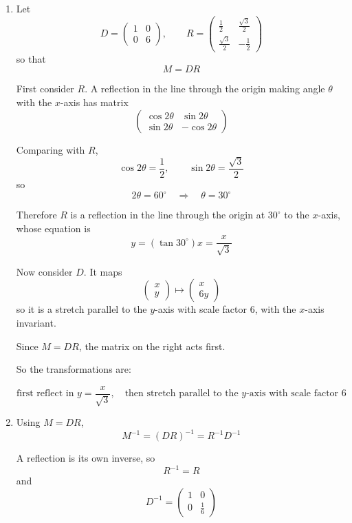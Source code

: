\documentclass[leqno]{article}
\begin{document}
\begin{enumerate}[
  label=\textbf{\arabic*.},
  leftmargin=*,
  topsep=0pt,
  partopsep=0pt,
  parsep=0pt
]
\vspace*{30pt}

\begin{tcolorbox}[colback=white, colframe=scarlet, title={\textbf{Solution}}, breakable, grow to left by=6mm, grow to right by=10mm]
\begin{enumerate}[label=\textbf{(\alph*)}]
\item Let
\[
D=\begin{pmatrix}1&0\\0&6\end{pmatrix},
\qquad
R=\begin{pmatrix}\frac12&\frac{\sqrt3}{2}\\[4pt]\frac{\sqrt3}{2}&-\frac12\end{pmatrix}
\]
so that
\[
M=DR
\]

First consider \(R\).  
A reflection in the line through the origin making angle \(\theta\) with the \(x\)-axis has matrix
\[
\begin{pmatrix}
\cos 2\theta & \sin 2\theta\\
\sin 2\theta & -\cos 2\theta
\end{pmatrix}
\]

Comparing with \(R\),
\[
\cos 2\theta=\frac12,
\qquad
\sin 2\theta=\frac{\sqrt3}{2}
\]
so
\[
2\theta=60^\circ
\quad\Rightarrow\quad
\theta=30^\circ
\]

Therefore \(R\) is a reflection in the line through the origin at \(30^\circ\) to the \(x\)-axis, whose equation is
\[
y=(\tan 30^\circ)x=\frac{x}{\sqrt3}
\]

Now consider \(D\). It maps
\[
\begin{pmatrix}x\\y\end{pmatrix}
\mapsto
\begin{pmatrix}x\\6y\end{pmatrix}
\]
so it is a stretch parallel to the \(y\)-axis with scale factor \(6\), with the \(x\)-axis invariant.

Since \(M=DR\), the matrix on the right acts first.

So the transformations are:

\[
\text{first reflect in } y=\frac{x}{\sqrt3},
\quad
\text{then stretch parallel to the } y\text{-axis with scale factor }6
\]

\item Using \(M=DR\),
\[
M^{-1}=(DR)^{-1}=R^{-1}D^{-1}
\]

A reflection is its own inverse, so
\[
R^{-1}=R
\]
and
\[
D^{-1}=\begin{pmatrix}1&0\\0&\frac16\end{pmatrix}
\]


\end{enumerate}
\end{tcolorbox}
\end{enumerate}
\end{document}
